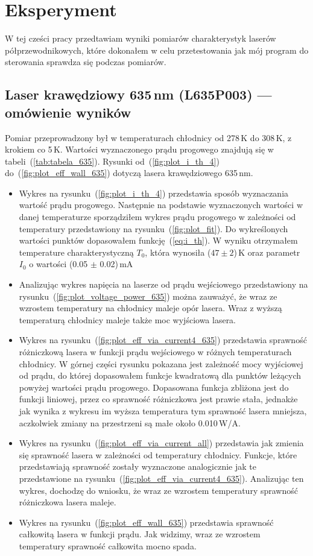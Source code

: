 \section{Eksperyment}
W tej cześci pracy przedtawiam wyniki pomiarów charakterystyk laserów półprzewodnikowych, które dokonałem w celu przetestowania
jak mój program do sterowania sprawdza się podczas pomiarów.
\subsection{Laser krawędziowy 635\,nm (L635P003) --- omówienie wyników}
Pomiar przeprowadzony był w temperaturach chłodnicy od 278\,K do 308\,K, z krokiem co 5\,K. Wartości wyznaczonego prądu progowego
znajdują się w tabeli~(\ref{tab:tabela_635}). Rysunki od~(\ref{fig:plot_i_th_4}) do~(\ref{fig:plot_eff_wall_635}) dotyczą lasera
krawędziowego 635\,nm.
\begin{itemize}
\item Wykres na rysunku~(\ref{fig:plot_i_th_4}) przedstawia sposób wyznaczania wartość prądu progowego. Następnie na podstawie
wyznaczonych wartości w danej temperaturze sporządziłem wykres prądu progowego w zależności od temperatury
przedstawiony na rysunku~(\ref{fig:plot_fit}). Do wykreślonych wartości punktów dopasowałem funkcję~(\ref{eq:i_th}).
W wyniku otrzymałem temperature charakterystyczną $T_0$, która wynosiła ($47 \pm 2$)\,K oraz parametr $I_0$ o wartości (0.05 $\pm$ 0.02)\,mA
\item Analizując wykres napięcia na laserze od prądu wejściowego przedstawiony na rysunku~(\ref{fig:plot_voltage_power_635})
można zauważyć, że wraz ze wzrostem temperatury na chłodnicy
maleje opór lasera. Wraz z wyższą temperaturą chłodnicy maleje także moc wyjściowa lasera.
\item Wykres na rysunku~(\ref{fig:plot_eff_via_current4_635}) przedstawia sprawność różniczkową lasera w funkcji prądu wejściowego
w różnych temperaturach chłodnicy. W górnej części rysunku pokazana jest zależność mocy wyjściowej od prądu, do której dopasowałem
funkcje kwadratową dla punktów leżących powyżej wartości prądu progowego. Dopasowana funkcja zbliżona jest do funkcji liniowej, przez co sprawność różniczkowa jest
prawie stała, jednakże jak wynika z wykresu im wyższa temperatura tym sprawność lasera mniejsza, aczkolwiek zmiany na
przestrzeni są małe około 0.010\,W/A.
\item Wykres na rysunku~(\ref{fig:plot_eff_via_current_all}) przedstawia jak zmienia się sprawność lasera w zależności od temperatury chłodnicy.
Funkcje, które przedstawiają sprawność zostały wyznaczone analogicznie jak te przedstawione na rysunku~(\ref{fig:plot_eff_via_current4_635}).
Analizując ten wykres, dochodzę do wniosku, że wraz ze wzrostem temperatury sprawność różniczkowa lasera maleje.
\item Wykres na rysunku~(\ref{fig:plot_eff_wall_635}) przedstawia sprawność całkowitą lasera w funkcji prądu. Jak widzimy,
wraz ze wzrostem temperatury sprawność całkowita mocno spada.
\end{itemize}
